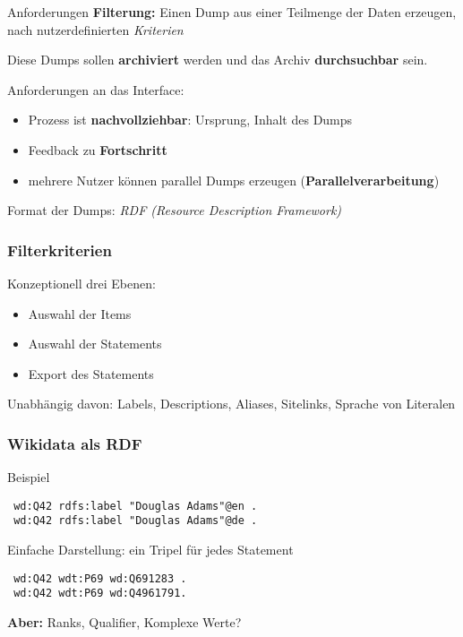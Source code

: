 \documentclass[aspectratio=169,xcolor=usenames,dvipsnames,svgnames]{beamer}
\begin{document}
\begin{frame}{Anforderungen}
  \alert{\textbf{Filterung:}} Einen Dump aus einer Teilmenge der Daten erzeugen, nach
  nutzerdefinierten \emph{Kriterien}

  Diese Dumps sollen \textbf{archiviert} werden und das Archiv \textbf{durchsuchbar} sein.

  \pause

  Anforderungen an das Interface:
  \begin{itemize}
      \item Prozess ist \textbf{nachvollziehbar}: Ursprung, Inhalt des Dumps
      \item Feedback zu \textbf{Fortschritt}
      \item mehrere Nutzer können parallel Dumps erzeugen (\textbf{Parallelverarbeitung})
  \end{itemize}

  \pause

  Format der Dumps: \emph{RDF (Resource Description Framework)}
\end{frame}


\begin{frame}[label=current]\frametitle{Filterkriterien}
  Konzeptionell drei Ebenen:
  \begin{itemize}
    \item Auswahl der Items
    \item Auswahl der Statements
    \item Export des Statements
  \end{itemize}

  Unabhängig davon: Labels, Descriptions, Aliases, Sitelinks, Sprache von Literalen
\end{frame}


\begin{frame}[t, fragile]\frametitle{Wikidata als RDF}
  \begin{block}{Beispiel}
  \begin{verbatim}
 wd:Q42 rdfs:label "Douglas Adams"@en .
 wd:Q42 rdfs:label "Douglas Adams"@de .
  \end{verbatim}
    \vspace{-0.2cm}
  \end{block}

  \begin{block}{Einfache Darstellung: ein Tripel für jedes Statement}
  \begin{verbatim}
 wd:Q42 wdt:P69 wd:Q691283 .
 wd:Q42 wdt:P69 wd:Q4961791.
  \end{verbatim}
    \vspace{-0.2cm}
  \end{block}

  \textbf{Aber:} Ranks, Qualifier, Komplexe Werte?
\end{frame}
\end{document}
